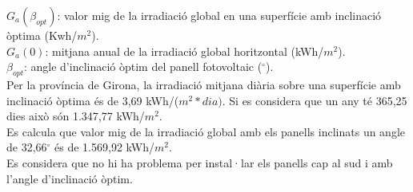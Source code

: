 \noindent $G_a(\beta_{opt})$: valor mig de la irradiació global en una superfície amb inclinació òptima (Kwh/$m^2$).\\
$G_a(0)$: mitjana anual de la irradiació global horitzontal (kWh/$m^2$).\\
$\beta_{opt}$: angle d'inclinació òptim del panell fotovoltaic ($^\circ$).\\
%
\newline Per la província de Girona, la irradiació mitjana diària sobre una superfície amb inclinació òptima és de 3,69 kWh/($m^2*dia)$. Si es considera que un any té 365,25 dies això són 1.347,77 kWh/$m^2$.\\ 
\newline Es calcula que valor mig de la irradiació global amb els panells inclinats un angle de 32,66$^\circ$ és de 1.569,92 kWh/$m^2$.\\
\newline Es considera que no hi ha problema per instal·lar els panells cap al sud i amb l'angle d'inclinació òptim.


